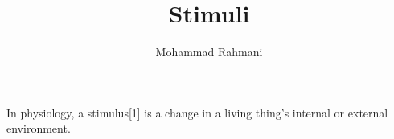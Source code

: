 \documentclass[a4paper]{article}
\title{Stimuli}
\date{}
\author{Mohammad Rahmani}
\begin{document}
    \maketitle
    
    In physiology, a stimulus[1] is a change in a living thing's internal or external environment.
    
    
\end{document}
